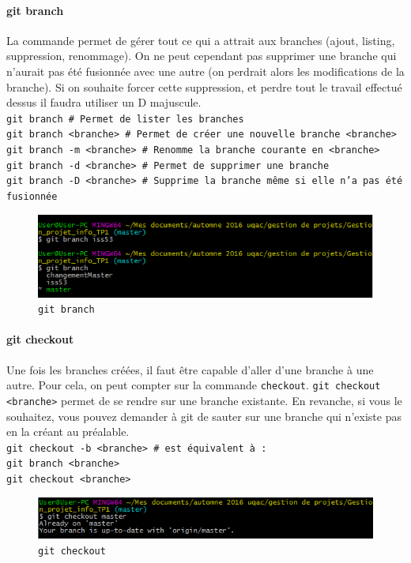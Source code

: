\documentclass[11pt,canadien]{article}
\begin{document}
\paragraph{git branch}La commande permet de gérer tout ce qui a attrait aux branches (ajout, listing, suppression, renommage). On ne peut cependant  pas supprimer une branche qui n'aurait pas été fusionnée avec une autre (on perdrait alors les modifications de la branche). Si on souhaite forcer cette suppression, et perdre tout le travail effectué dessus il faudra utiliser un D majuscule. \\
\texttt{git branch               \# Permet de lister les branches \\
		git branch <branche>     \# Permet de créer une nouvelle branche <branche> \\
		git branch -m <branche>  \# Renomme la branche courante en <branche> \\
		git branch -d <branche>  \# Permet de supprimer une branche \\
		git branch -D <branche>  \# Supprime la branche même si elle n'a pas été fusionnée
}
\begin{figure}
	\centering
	\includegraphics{images/git_branch.png}
	\caption{\texttt{git branch}}
	\label{fig:git_branch}
\end{figure}

\paragraph{git checkout}Une fois les branches créées, il faut être capable d'aller d'une branche à une autre. Pour cela, on peut compter sur la commande \texttt{checkout}. \texttt{git checkout <branche>} permet de se rendre sur une branche existante. En revanche, si vous le souhaitez, vous pouvez demander à git de sauter sur une branche qui n'existe pas en la créant au préalable. \\
\texttt{git checkout -b <branche> \# est équivalent à : \\
		git branch <branche> \\
		git checkout <branche>
}
\begin{figure}
	\centering
	\includegraphics{images/git_checkout.png}
	\caption{\texttt{git checkout}}
	\label{fig:git_checkout}
\end{figure}
\end{document}
